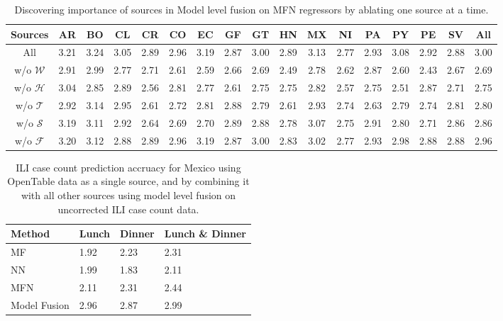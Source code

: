 \begin{table*}[tb!]
  \scriptsize
  \centering
\captionsetup{font=scriptsize}
  \caption{\label{tb:Ablation} Discovering importance of sources in Model level fusion on MFN 
  regressors by ablating one source at a time.}
\vspace{-1em}
\begin{tabular}{|*{17}{c|}}
\hline
Sources & AR & BO & CL & CR & CO & EC & GF & GT & HN & MX & NI & PA & PY & PE & SV & All\\
\hline 
\hline
All               & 3.21& 3.24& 3.05& 2.89& 2.96& 3.19& 2.87& 3.00& 2.89& 3.13& 2.77& 2.93& 3.08& 2.92& 2.88& 3.00\\
w/o $\mathcal{W}$ & 2.91& 2.99& 2.77& 2.71& 2.61& 2.59& 2.66& 2.69& 2.49& 2.78& 2.62& 2.87& 2.60& 2.43& 2.67& 2.69  \\
w/o $\mathcal{H}$ & 3.04& 2.85& 2.89& 2.56& 2.81& 2.77& 2.61& 2.75& 2.75& 2.82& 2.57& 2.75& 2.51& 2.87& 2.71& 2.75  \\
w/o $\mathcal{T}$ & 2.92& 3.14& 2.95& 2.61& 2.72& 2.81& 2.88& 2.79& 2.61& 2.93& 2.74& 2.63& 2.79& 2.74& 2.81& 2.80  \\
w/o $\mathcal{S}$ & 3.19& 3.11& 2.92& 2.64& 2.69& 2.70& 2.89& 2.88& 2.78& 3.07& 2.75& 2.91& 2.80& 2.71& 2.86& 2.86  \\
w/o $\mathcal{F}$ & 3.20& 3.12& 2.88& 2.89& 2.96& 3.19& 2.87& 3.00& 2.83& 3.02& 2.77& 2.93& 2.98& 2.88& 2.88& 2.96  \\
\hline
\end{tabular}
\vspace{-1em}
\end{table*}
\begin{table}[t]
  \scriptsize
\centering
\captionsetup{font=scriptsize}
\caption{\label{tb:opentable}  ILI case count prediction accruacy for Mexico using OpenTable data as a single source, and
by combining it with all other sources using model level fusion on uncorrected ILI case count data.}
\vspace{-1em}
\begin{tabular}{|p{1.5cm}|*{2}{l|}p{2cm}|}
\hline
Method& Lunch & Dinner & Lunch \& Dinner \\
\hline \hline
MF   & 1.92 & 2.23 & 2.31 \\
NN   & 1.99 & 1.83 & 2.11 \\
MFN  & 2.11 & 2.31 & 2.44 \\
Model Fusion & 2.96 & 2.87 & 2.99 \\
\hline
\end{tabular}
\vspace{-3em}
\end{table}

